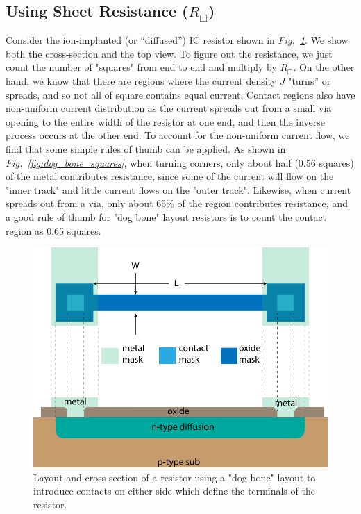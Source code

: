 \subsection{Using Sheet Resistance (\texorpdfstring{$R_\Box$}{})}
Consider the ion-implanted (or “diffused”) IC resistor shown in \emph{Fig.~\ref{fig:diff_resistor_top}}.  We show both the cross-section and the top view.  To figure out the resistance, we just count the number of "squares" from end to end and multiply by $R_\Box$.  On the other hand, we know that there are regions where the current density $J$ "turns” or spreads, and so not all of square contains equal current.   Contact regions also have non-uniform current distribution as the current spreads out from a small via opening to the entire width of the resistor at one end, and then the inverse process occurs at the other end.  To account for the non-uniform current flow, we find that some simple rules of thumb can be applied.  As shown in \emph{Fig.~\ref{fig:dog_bone_squares}}, when turning corners, only about half (0.56 squares) of the metal contributes resistance, since some of the current will flow on the "inner track" and little current flows on the "outer track".  Likewise, when current spreads out from a via, only about 65\% of the region contributes resistance, and a good rule of thumb for "dog bone" layout resistors is to count the contact region as 0.65 squares.
\begin{figure}[tb]
\centering
\includegraphics[width=.7\columnwidth]{diff_resistor_top}
\caption{Layout and cross section of a resistor using a "dog bone" layout to introduce contacts on either side which define the terminals of the resistor.}
\label{fig:diff_resistor_top}
\end{figure}
